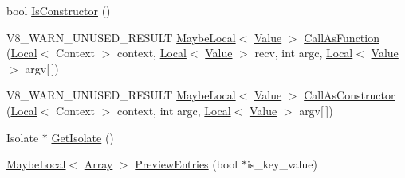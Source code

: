 \begin{DoxyCompactItemize}
bool \mbox{\hyperlink{classv8_1_1Object_a257233cb6b11dc7bb5a0e8df8695e889}{Is\+Constructor}} ()
\item 
V8\+\_\+\+W\+A\+R\+N\+\_\+\+U\+N\+U\+S\+E\+D\+\_\+\+R\+E\+S\+U\+LT \mbox{\hyperlink{classv8_1_1MaybeLocal}{Maybe\+Local}}$<$ \mbox{\hyperlink{classv8_1_1Value}{Value}} $>$ \mbox{\hyperlink{classv8_1_1Object_aec7375fe34a800baac4e26deb33ccac0}{Call\+As\+Function}} (\mbox{\hyperlink{classv8_1_1Local}{Local}}$<$ Context $>$ context, \mbox{\hyperlink{classv8_1_1Local}{Local}}$<$ \mbox{\hyperlink{classv8_1_1Value}{Value}} $>$ recv, int argc, \mbox{\hyperlink{classv8_1_1Local}{Local}}$<$ \mbox{\hyperlink{classv8_1_1Value}{Value}} $>$ argv\mbox{[}$\,$\mbox{]})
\item 
V8\+\_\+\+W\+A\+R\+N\+\_\+\+U\+N\+U\+S\+E\+D\+\_\+\+R\+E\+S\+U\+LT \mbox{\hyperlink{classv8_1_1MaybeLocal}{Maybe\+Local}}$<$ \mbox{\hyperlink{classv8_1_1Value}{Value}} $>$ \mbox{\hyperlink{classv8_1_1Object_a10dcefb0bd595a959234703690a02530}{Call\+As\+Constructor}} (\mbox{\hyperlink{classv8_1_1Local}{Local}}$<$ Context $>$ context, int argc, \mbox{\hyperlink{classv8_1_1Local}{Local}}$<$ \mbox{\hyperlink{classv8_1_1Value}{Value}} $>$ argv\mbox{[}$\,$\mbox{]})
\item 
Isolate $\ast$ \mbox{\hyperlink{classv8_1_1Object_ab991b53d50ab3ce53179e927e52b24f5}{Get\+Isolate}} ()
\item 
\mbox{\hyperlink{classv8_1_1MaybeLocal}{Maybe\+Local}}$<$ \mbox{\hyperlink{classv8_1_1Array}{Array}} $>$ \mbox{\hyperlink{classv8_1_1Object_a6705d705f6ddb941100a46875609c63a}{Preview\+Entries}} (bool $\ast$is\+\_\+key\+\_\+value)
\end{DoxyCompactItemize}
